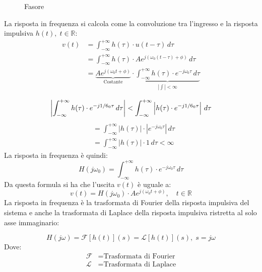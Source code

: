 \documentclass[a4paper]{article}
\begin{document}
\begin{figure}[H]
  \centering
  \caption{Fasore}
\end{figure}
La risposta in frequenza si calcola come la convoluzione tra l'ingresso e la risposta
impulsiva \( h(t),\; t \in \mathbb{R} \):
\[
  \begin{aligned}
    v(t) &= \int_{-\infty}^{+\infty} h(\tau) \cdot u(t-\tau) \, d\tau\\
         &= \int_{-\infty}^{+\infty} h(\tau) \cdot A e^{j \left( \omega_0 \left( t - 
         \tau \right) + \phi \right) } \, d\tau\\
         &= 
         \underbrace{A e^{j \left( \omega_0 t + \phi \right) }}_{\text{Costante}}
         \cdot 
         \underbrace{\int_{-\infty}^{+\infty} h(\tau) \cdot e^{-j \omega_0 \tau} \, d\tau}_
         { \left| \int \right| < \infty }\\
  \end{aligned}
\] 
\[
  \left| \int_{-\infty}^{+\infty} h(\tau) \cdot e^{-j \omega_0 \tau} \, d\tau \right| <
  \int_{-\infty}^{+\infty} \left| h(\tau) \cdot e^{-j \omega_0 \tau} \right| \, d\tau\\
\] 
\[
  \begin{aligned}
    &= \int_{-\infty}^{+\infty} \left| h(\tau) \right| \cdot \left| e^{-j \omega_0 \tau} \right| \, d\tau\\
    &= \int_{-\infty}^{+\infty} \left| h(\tau) \right| \cdot 1 \, d\tau < \infty
  \end{aligned}
\] 
La risposta in frequenza è quindi:
\[
  H(j \omega_0) = \int_{-\infty}^{+\infty} h(\tau) \cdot e^{-j \omega_0 \tau} \, d\tau
\] 
Da questa formula si ha che l'uscita \( v(t) \) è uguale a:
\[
  v(t) = H(j \omega_0) \cdot A e^{j \left( \omega_0 t + \phi \right) }, \quad t \in \mathbb{R}
\] 
La risposta in frequenza è la trasformata di Fourier della risposta impulsiva del sistema e
anche la trasformata di Laplace della risposta impulsiva ristretta al solo asse immaginario:
\begin{theorem}
  \[
    H(j \omega) = \mathcal{F}[h(t)](s) = \mathcal{L}[h(t)](s), \; s = j \omega
  \] 
  Dove:
  \[
    \begin{aligned}
      \mathcal{F} &= \text{Trasformata di Fourier}\\
      \mathcal{L} &= \text{Trasformata di Laplace}
    \end{aligned}
  \] 
\end{theorem}
\end{document}
